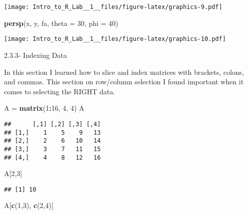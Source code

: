 \documentclass[]{article}
\newenvironment{Shaded}{\begin{snugshade}}{\end{snugshade}}
\newcommand{\KeywordTok}[1]{\textcolor[rgb]{0.13,0.29,0.53}{\textbf{#1}}}
\newcommand{\DataTypeTok}[1]{\textcolor[rgb]{0.13,0.29,0.53}{#1}}
\newcommand{\DecValTok}[1]{\textcolor[rgb]{0.00,0.00,0.81}{#1}}
\newcommand{\StringTok}[1]{\textcolor[rgb]{0.31,0.60,0.02}{#1}}
\newcommand{\OperatorTok}[1]{\textcolor[rgb]{0.81,0.36,0.00}{\textbf{#1}}}
\newcommand{\NormalTok}[1]{#1}
\begin{document}
\texttt{[image: Intro\_to\_R\_Lab\_\_1\_\_files/figure-latex/graphics-9.pdf]}

\begin{Shaded}
\begin{Highlighting}[]
\KeywordTok{persp}\NormalTok{(x, y, fa, }\DataTypeTok{theta =} \DecValTok{30}\NormalTok{, }\DataTypeTok{phi =} \DecValTok{40}\NormalTok{)}
\end{Highlighting}
\end{Shaded}

\texttt{[image: Intro\_to\_R\_Lab\_\_1\_\_files/figure-latex/graphics-10.pdf]}

2.3.3- Indexing Data

In this section I learned how to slice and index matrices with brackets,
colons, and commas. This section on row/column selection I found
important when it comes to selecting the RIGHT data.

\begin{Shaded}
\begin{Highlighting}[]
\NormalTok{A =}\StringTok{ }\KeywordTok{matrix}\NormalTok{(}\DecValTok{1}\OperatorTok{:}\DecValTok{16}\NormalTok{, }\DecValTok{4}\NormalTok{, }\DecValTok{4}\NormalTok{)}
\NormalTok{A}
\end{Highlighting}
\end{Shaded}

\begin{verbatim}
##      [,1] [,2] [,3] [,4]
## [1,]    1    5    9   13
## [2,]    2    6   10   14
## [3,]    3    7   11   15
## [4,]    4    8   12   16
\end{verbatim}

\begin{Shaded}
\begin{Highlighting}[]
\NormalTok{A[}\DecValTok{2}\NormalTok{,}\DecValTok{3}\NormalTok{]}
\end{Highlighting}
\end{Shaded}

\begin{verbatim}
## [1] 10
\end{verbatim}

\begin{Shaded}
\begin{Highlighting}[]
\NormalTok{A[}\KeywordTok{c}\NormalTok{(}\DecValTok{1}\NormalTok{,}\DecValTok{3}\NormalTok{), }\KeywordTok{c}\NormalTok{(}\DecValTok{2}\NormalTok{,}\DecValTok{4}\NormalTok{)]}
\end{Highlighting}
\end{Shaded}
\end{document}
